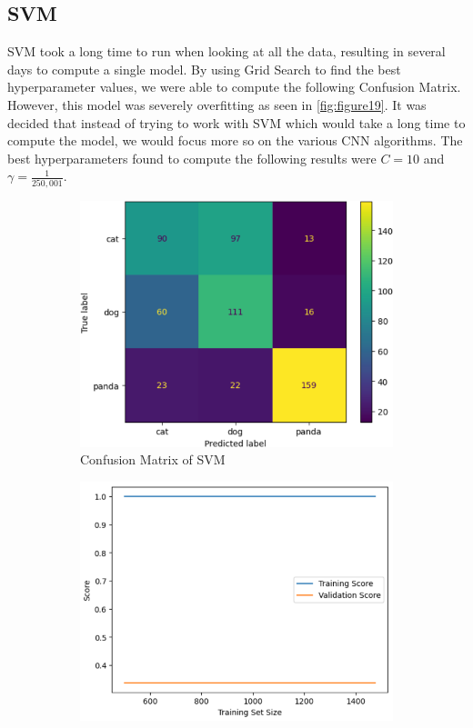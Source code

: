 \subsection{SVM}

SVM took a long time to run when looking at all the data, resulting in several days to compute a single model.
By using Grid Search to find the best hyperparameter values, we were able to compute the following Confusion Matrix.
However, this model was severely overfitting as seen in \ref{fig:figure19}.
It was decided that instead of trying to work with SVM which would take a long time to compute the model, we would focus more so on the various CNN algorithms.
The best hyperparameters found to compute the following results were $C = 10$ and $\gamma = \frac{1}{250,001}$.

\begin{figure}[h]
    \begin{subfigure}{0.4\textwidth}
        \centering
        \includegraphics[scale=0.5]{csvm_cfm}
        \caption{Confusion Matrix of SVM}
        \label{fig:figure3}
    \end{subfigure}
    \hspace{0.2\textwidth}
	\begin{subfigure}{0.4\textwidth}
        \centering
        \includegraphics[scale=0.5]{svm_overfit}

\end{subfigure}
\end{figure}
